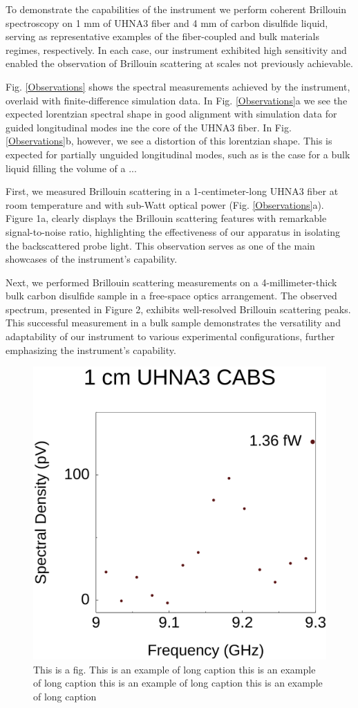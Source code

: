 \documentclass[sn-nature]{sn-jnl}%
\begin{document}
To demonstrate the capabilities of the instrument we perform coherent Brillouin spectroscopy on 1 mm of UHNA3 fiber and 4 mm of carbon disulfide liquid, serving as representative examples of the fiber-coupled and bulk materials regimes, respectively. In each case, our instrument exhibited high sensitivity and enabled the observation of Brillouin scattering at scales not previously achievable.

Fig. \ref{Observations} shows the spectral measurements achieved by the instrument, overlaid with finite-difference simulation data. In Fig. \ref{Observations}a we see the expected lorentzian spectral shape in good alignment with simulation data for guided longitudinal modes ine the core of the UHNA3 fiber. In Fig. \ref{Observations}b, however, we see a distortion of this lorentzian shape. This is expected for partially unguided longitudinal modes, such as is the case for a bulk liquid filling the volume of a ...

First, we measured Brillouin scattering in a 1-centimeter-long UHNA3 fiber at room temperature and with sub-Watt optical power (Fig. \ref{Observations}a). Figure 1a, clearly displays the Brillouin scattering features with remarkable signal-to-noise ratio, highlighting the effectiveness of our apparatus in isolating the backscattered probe light. This observation serves as one of the main showcases of the instrument's capability.

Next, we performed Brillouin scattering measurements on a 4-millimeter-thick bulk carbon disulfide sample in a free-space optics arrangement. The observed spectrum, presented in Figure 2, exhibits well-resolved Brillouin scattering peaks. This successful measurement in a bulk sample demonstrates the versatility and adaptability of our instrument to various experimental configurations, further emphasizing the instrument's capability.

\begin{figure}[t]
\centering
\includegraphics[width=.45\textwidth]{Sensitivity.pdf}
\caption{This is a fig. This is an example of long caption this is an example of long caption this is an example of long caption this is an example of long caption}\label{Sensitivity}
\end{figure}
\end{document}

